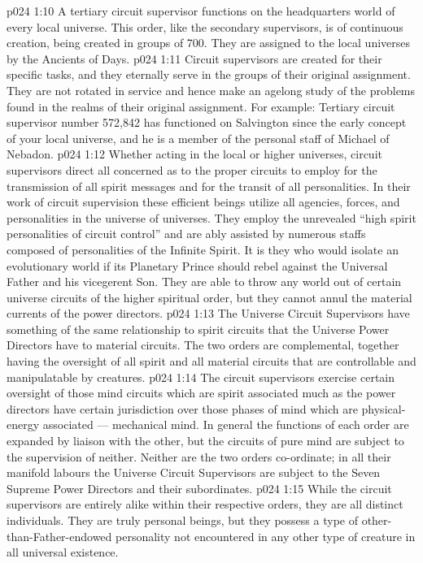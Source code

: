 \vs p024 1:10 A tertiary circuit supervisor functions on the headquarters world of every local universe. This order, like the secondary supervisors, is of continuous creation, being created in groups of 700. They are assigned to the local universes by the Ancients of Days.
\vs p024 1:11 Circuit supervisors are created for their specific tasks, and they eternally serve in the groups of their original assignment. They are not rotated in service and hence make an agelong study of the problems found in the realms of their original assignment. For example: Tertiary circuit supervisor number 572,842 has functioned on Salvington since the early concept of your local universe, and he is a member of the personal staff of Michael of Nebadon.
\vs p024 1:12 \pc Whether acting in the local or higher universes, circuit supervisors direct all concerned as to the proper circuits to employ for the transmission of all spirit messages and for the transit of all personalities. In their work of circuit supervision these efficient beings utilize all agencies, forces, and personalities in the universe of universes. They employ the unrevealed “high spirit personalities of circuit control” and are ably assisted by numerous staffs composed of personalities of the Infinite Spirit. It is they who would isolate an evolutionary world if its Planetary Prince should rebel against the Universal Father and his vicegerent Son. They are able to throw any world out of certain universe circuits of the higher spiritual order, but they cannot annul the material currents of the power directors.
\vs p024 1:13 \pc The Universe Circuit Supervisors have something of the same relationship to spirit circuits that the Universe Power Directors have to material circuits. The two orders are complemental, together having the oversight of all spirit and all material circuits that are controllable and manipulatable by creatures.
\vs p024 1:14 The circuit supervisors exercise certain oversight of those mind circuits which are spirit associated much as the power directors have certain jurisdiction over those phases of mind which are physical\hyp{}energy associated --- mechanical mind. In general the functions of each order are expanded by liaison with the other, but the circuits of pure mind are subject to the supervision of neither. Neither are the two orders co\hyp{}ordinate; in all their manifold labours the Universe Circuit Supervisors are subject to the Seven Supreme Power Directors and their subordinates.
\vs p024 1:15 \pc While the circuit supervisors are entirely alike within their respective orders, they are all distinct individuals. They are truly personal beings, but they possess a type of other\hyp{}than\hyp{}Father\hyp{}endowed personality not encountered in any other type of creature in all universal existence.
